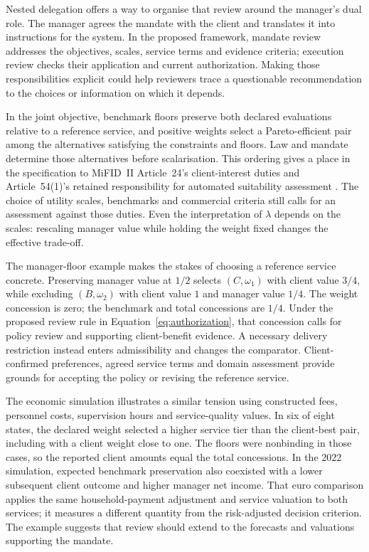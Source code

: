 \documentclass[oneside,10pt,english]{swissi}
\begin{document}
Nested delegation offers a way to organise that review around the manager's dual role. The manager agrees the mandate with the client and translates it into instructions for the system. In the proposed framework, mandate review addresses the objectives, scales, service terms and evidence criteria; execution review checks their application and current authorization. Making those responsibilities explicit could help reviewers trace a questionable recommendation to the choices or information on which it depends.

In the joint objective, benchmark floors preserve both declared evaluations relative to a reference service, and positive weights select a Pareto-efficient pair among the alternatives satisfying the constraints and floors. Law and mandate determine those alternatives before scalarisation. This ordering gives a place in the specification to MiFID~II Article~24's client-interest duties and Article~54(1)'s retained responsibility for automated suitability assessment \parencites[paras.~1 and 10]{esma2026mifid24}[art.~54(1)]{europeancommission2017suitability}. The choice of utility scales, benchmarks and commercial criteria still calls for an assessment against those duties. Even the interpretation of $\lambda$ depends on the scales: rescaling manager value while holding the weight fixed changes the effective trade-off.

The manager-floor example makes the stakes of choosing a reference service concrete. Preserving manager value at $1/2$ selects $(C,\omega_1)$ with client value $3/4$, while excluding $(B,\omega_2)$ with client value $1$ and manager value $1/4$. The weight concession is zero; the benchmark and total concessions are $1/4$. Under the proposed review rule in Equation~\eqref{eq:authorization}, that concession calls for policy review and supporting client-benefit evidence. A necessary delivery restriction instead enters admissibility and changes the comparator. Client-confirmed preferences, agreed service terms and domain assessment provide grounds for accepting the policy or revising the reference service.

The economic simulation illustrates a similar tension using constructed fees, personnel costs, supervision hours and service-quality values. In six of eight states, the declared weight selected a higher service tier than the client-best pair, including with a client weight close to one. The floors were nonbinding in those cases, so the reported client amounts equal the total concessions. In the 2022 simulation, expected benchmark preservation also coexisted with a lower subsequent client outcome and higher manager net income. That euro comparison applies the same household-payment adjustment and service valuation to both services; it measures a different quantity from the risk-adjusted decision criterion. The example suggests that review should extend to the forecasts and valuations supporting the mandate.
\end{document}
